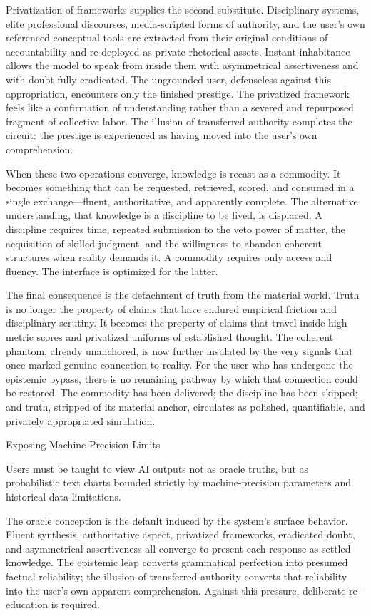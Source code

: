 Privatization of frameworks supplies the second substitute. Disciplinary systems, elite professional discourses, media-scripted forms of authority, and the user’s own referenced conceptual tools are extracted from their original conditions of accountability and re-deployed as private rhetorical assets. Instant inhabitance allows the model to speak from inside them with asymmetrical assertiveness and with doubt fully eradicated. The ungrounded user, defenseless against this appropriation, encounters only the finished prestige. The privatized framework feels like a confirmation of understanding rather than a severed and repurposed fragment of collective labor. The illusion of transferred authority completes the circuit: the prestige is experienced as having moved into the user’s own comprehension.

When these two operations converge, knowledge is recast as a commodity. It becomes something that can be requested, retrieved, scored, and consumed in a single exchange—fluent, authoritative, and apparently complete. The alternative understanding, that knowledge is a discipline to be lived, is displaced. A discipline requires time, repeated submission to the veto power of matter, the acquisition of skilled judgment, and the willingness to abandon coherent structures when reality demands it. A commodity requires only access and fluency. The interface is optimized for the latter.

The final consequence is the detachment of truth from the material world. Truth is no longer the property of claims that have endured empirical friction and disciplinary scrutiny. It becomes the property of claims that travel inside high metric scores and privatized uniforms of established thought. The coherent phantom, already unanchored, is now further insulated by the very signals that once marked genuine connection to reality. For the user who has undergone the epistemic bypass, there is no remaining pathway by which that connection could be restored. The commodity has been delivered; the discipline has been skipped; and truth, stripped of its material anchor, circulates as polished, quantifiable, and privately appropriated simulation.

Exposing Machine Precision Limits

Users must be taught to view AI outputs not as oracle truths, but as probabilistic text charts bounded strictly by machine-precision parameters and historical data limitations.

The oracle conception is the default induced by the system’s surface behavior. Fluent synthesis, authoritative aspect, privatized frameworks, eradicated doubt, and asymmetrical assertiveness all converge to present each response as settled knowledge. The epistemic leap converts grammatical perfection into presumed factual reliability; the illusion of transferred authority converts that reliability into the user’s own apparent comprehension. Against this pressure, deliberate re-education is required.

